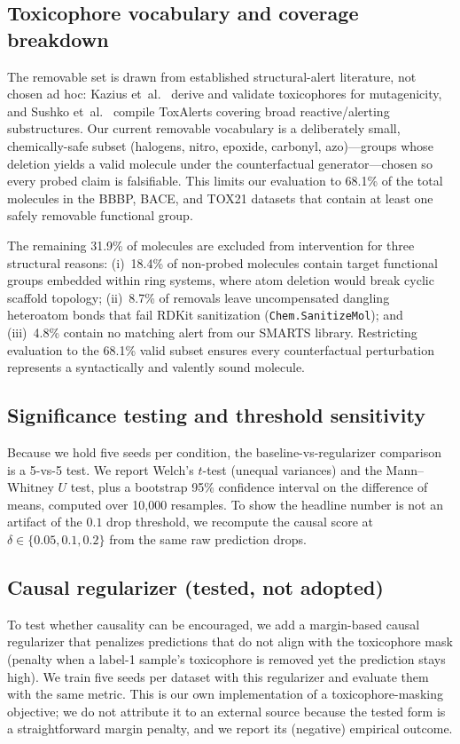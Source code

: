 \documentclass[a4paper,fleqn]{cas-dc}
\begin{document}
\subsection{Toxicophore vocabulary and coverage breakdown}
The removable set is drawn from established structural-alert literature, not chosen ad hoc: Kazius et~al.~\cite{kazius2005derivation} derive and validate toxicophores for mutagenicity, and Sushko et~al.~\cite{sushko2012toxalerts} compile ToxAlerts covering broad reactive/alerting substructures. Our current removable vocabulary is a deliberately small, chemically-safe subset (halogens, nitro, epoxide, carbonyl, azo)---groups whose deletion yields a valid molecule under the counterfactual generator---chosen so every probed claim is falsifiable. This limits our evaluation to 68.1\% of the total molecules in the BBBP, BACE, and TOX21 datasets that contain at least one safely removable functional group.

The remaining 31.9\% of molecules are excluded from intervention for three structural reasons: (i)~18.4\% of non-probed molecules contain target functional groups embedded within ring systems, where atom deletion would break cyclic scaffold topology; (ii)~8.7\% of removals leave uncompensated dangling heteroatom bonds that fail RDKit sanitization (\texttt{Chem.SanitizeMol}); and (iii)~4.8\% contain no matching alert from our SMARTS library. Restricting evaluation to the 68.1\% valid subset ensures every counterfactual perturbation represents a syntactically and valently sound molecule.

\subsection{Significance testing and threshold sensitivity}
Because we hold five seeds per condition, the baseline-vs-regularizer comparison is a 5-vs-5 test. We report Welch's $t$-test (unequal variances) and the Mann--Whitney $U$ test, plus a bootstrap 95\% confidence interval on the difference of means, computed over 10,000 resamples. To show the headline number is not an artifact of the $0.1$ drop threshold, we recompute the causal score at $\delta \in \{0.05, 0.1, 0.2\}$ from the same raw prediction drops.

\subsection{Causal regularizer (tested, not adopted)}
To test whether causality can be encouraged, we add a margin-based causal regularizer that penalizes predictions that do not align with the toxicophore mask (penalty when a label-1 sample's toxicophore is removed yet the prediction stays high). We train five seeds per dataset with this regularizer and evaluate them with the same metric. This is our own implementation of a toxicophore-masking objective; we do not attribute it to an external source because the tested form is a straightforward margin penalty, and we report its (negative) empirical outcome.
\end{document}
